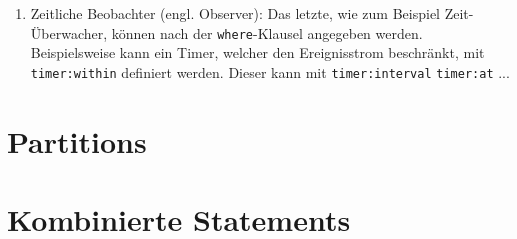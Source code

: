 \begin{enumerate}
	\begin{lstlisting}[caption={Pattern mit Follow-Operator }\label{follow_pattern},captionpos=b,language=SQL]
	
	every a = GameActionEvent(action="FOLD") -> b =
	 GameEndEvent(a.playerName != b.playerName)
	
	\end{lstlisting}
	
	\item Zeitliche Beobachter (engl. Observer):
	Das letzte, wie zum Beispiel Zeit-Überwacher, können nach der \texttt{where}-Klausel angegeben werden. Beispielsweise kann ein Timer, welcher den Ereignisstrom beschränkt, mit \texttt{timer:within} definiert werden. Dieser kann mit \texttt{timer:interval}
	\texttt{timer:at}
	...
\end{enumerate}


\section{Partitions}

\section{Kombinierte Statements}

